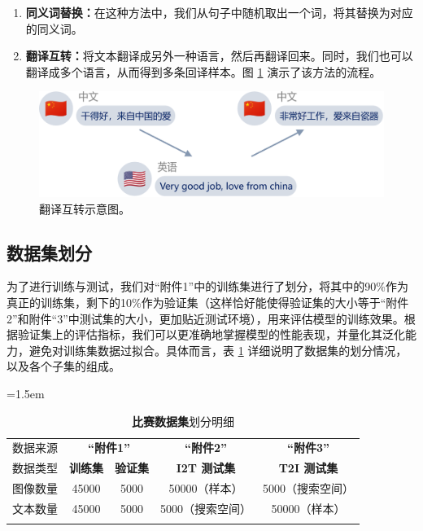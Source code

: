 \documentclass[a4paper]{zreport}
\begin{document}
\begin{enumerate}
\item \textbf{同义词替换：}在这种方法中，我们从句子中随机取出一个词，将其替换为对应的同义词。
\item \textbf{翻译互转：}将文本翻译成另外一种语言，然后再翻译回来。同时，我们也可以翻译成多个语言，从而得到多条回译样本。图 \ref{fig:translate} 演示了该方法的流程。
\end{enumerate}

\begin{figure}[h]
\centering
\includegraphics[width=\linewidth]{figures/translate}
\caption{翻译互转示意图。}
\label{fig:translate}
\end{figure}


\subsection{数据集划分}

为了进行训练与测试，我们对“附件1”中的训练集进行了划分，将其中的90\%作为真正的训练集，剩下的10\%作为验证集（这样恰好能使得验证集的大小等于“附件2”和附件“3”中测试集的大小，更加贴近测试环境），用来评估模型的训练效果。根据验证集上的评估指标，我们可以更准确地掌握模型的性能表现，并量化其泛化能力，避免对训练集数据过拟合。具体而言，表 \ref{tbl:DataSplit} 详细说明了数据集的划分情况，以及各个子集的组成。

\begin{table}[h]
\centering
\tabcolsep=1.5em
\renewcommand\arraystretch{1.5}
\caption{\textbf{比赛数据集}划分明细}
\vspace{1em}
\begin{tabular}{c|c|c|c|c}
    \Xhline{2pt}
    数据来源 & \multicolumn{2}{c|}{\textbf{“附件1”}} & \multicolumn{1}{c|}{\textbf{“附件2”}} & 
    \multicolumn{1}{c}{\textbf{“附件3”}}\\
    
    \Xhline{1.5pt}

    数据类型 & \textbf{训练集} & \textbf{验证集} & \textbf{I2T 测试集} & \textbf{T2I 测试集} \\
    \Xhline{0.4pt}
    图像数量 & {45000} & {5000} & {50000（样本）} & {5000（搜索空间）} \\
    \Xhline{0.4pt}
    文本数量 & {45000} & {5000} & {5000（搜索空间）} & {50000（样本）} \\

    \Xhline{2pt}
\end{tabular} \label{tbl:DataSplit}
\end{table}
\end{document}
